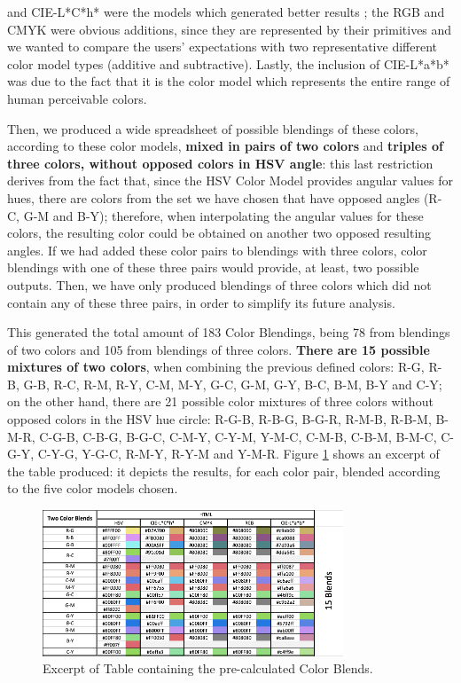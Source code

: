 and CIE-L*C*h* were the models which generated better results \cite{Gama20141,Gama20142}; the RGB and CMYK were obvious
additions, since they are represented by their primitives and we wanted to compare the users' expectations with two
representative different color model types (additive and subtractive). Lastly, the inclusion of CIE-L*a*b* was due to the fact
that it is the color model which represents the entire range of human perceivable colors. \par
%
Then, we produced a wide spreadsheet of possible blendings of these colors, according to these color models, \textbf{mixed in
pairs of two colors} and \textbf{triples of three colors, without opposed colors in HSV angle}: this last restriction derives
from the fact that, since the HSV Color Model provides angular values for hues, there are colors from the set we have chosen
that have opposed angles (R-C, G-M and B-Y); therefore, when interpolating the angular values for these colors, the resulting color
could be obtained on another two opposed resulting angles. If we had added these color pairs to blendings with three colors,
color blendings with one of these three pairs would provide, at least, two possible outputs. Then, we have only produced blendings
of three colors which did not contain any of these three pairs, in order to simplify its future analysis. \par
%
This generated the total amount of 183 Color Blendings, being 78 from blendings of two colors and 105 from blendings of three colors. \textbf{There are 15
possible mixtures of two colors}, when combining the previous defined colors: R-G, R-B, G-B, R-C, R-M, R-Y, C-M, M-Y, G-C, G-M,
G-Y, B-C, B-M, B-Y and C-Y; on the other hand, there are 21 possible color mixtures of three colors without opposed colors in the
HSV hue circle: R-G-B, R-B-G, B-G-R, R-M-B, R-B-M, B-M-R, C-G-B, C-B-G, B-G-C, C-M-Y, C-Y-M, Y-M-C, C-M-B, C-B-M, B-M-C, C-G-Y,
C-Y-G, Y-G-C, R-M-Y, R-Y-M and Y-M-R. Figure \ref{fig:table_blends} shows an excerpt of the table produced: it depicts the results,
for each color pair, blended according to the five color models chosen.
%
\begin{figure}[htbp]
	\centering
  \includegraphics[width=0.8\textwidth]{images/implementation/table_blends.png}
  \caption[Excerpt of Table containing the pre-calculated Color Blends.]{Excerpt of Table containing the pre-calculated Color Blends.}
  \label{fig:table_blends}
\end{figure} \par
